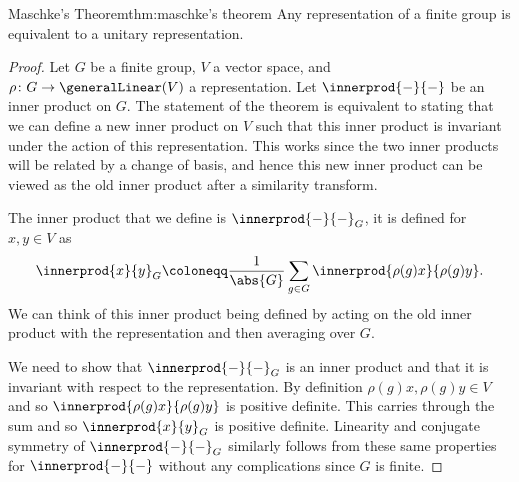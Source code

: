 \begin{thm}{Maschke's Theorem}{thm:maschke's theorem}
    Any representation of a finite group is equivalent to a unitary
    representation.
    
    \begin{proof}
        Let \(G\) be a finite group, \(V\) a vector space, and \(\rho\colon
        G \to \generalLinear(V)\) a representation.
        Let \(\innerprod{-}{-}\) be an inner product on \(G\).
        The statement of the theorem is equivalent to stating that we can
        define a new inner product on \(V\) such that this inner product is invariant
        under the action of this representation.
        This works since the two inner products will be related by a change
        of basis, and hence this new inner product can be viewed as the old inner
        product after a similarity transform.
        
        The inner product that we define is \(\innerprod{-}{-}_G\), it is
        defined for \(x, y \in V\) as
        \begin{equation}
            \innerprod{x}{y}_G \coloneqq \frac{1}{\abs{G}} \sum_{g \in G}
            \innerprod{\rho(g)x}{\rho(g)y}.
        \end{equation}
        We can think of this inner product being defined by acting on the
        old inner product with the representation and then averaging over \(G\).
        
        We need to show that \(\innerprod{-}{-}_G\) is an inner product and
        that it is invariant with respect to the representation.
        By definition \(\rho(g)x, \rho(g)y \in V\) and so
        \(\innerprod{\rho(g)x}{\rho(g)y}\) is positive definite.
        This carries through the sum and so \(\innerprod{x}{y}_G\) is
        positive definite.
        Linearity and conjugate symmetry of \(\innerprod{-}{-}_G\) similarly
        follows from these same properties for \(\innerprod{-}{-}\) without any
        complications since \(G\) is finite.
        

\end{proof}
\end{thm}
